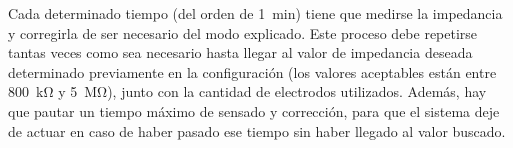 Cada determinado tiempo (del orden de \SI{1}{\minute}) tiene que medirse la impedancia y corregirla de ser necesario del modo explicado. Este proceso debe repetirse tantas veces como sea necesario hasta llegar al valor de impedancia deseada determinado previamente en la configuración (los valores aceptables están entre \SI{800}{\kilo\ohm} y \SI{5}{\mega\ohm}), junto con la cantidad de electrodos utilizados. Además, hay que pautar un tiempo máximo de sensado y corrección, para que el sistema deje de actuar en caso de haber pasado ese tiempo sin haber llegado al valor buscado.



